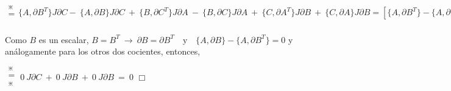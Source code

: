 \documentclass[a4paper,10pt]{article}
\begin{document}
$\begin{matrix} _\divideontimes \\ =  \\ \, \end{matrix}
\{A, \partial B^T\}J \partial C - \ \{A,\partial B\}J \partial C \ 
+ \ 
\{B, \partial  C^T\}J \partial A \ -\  \{B,\partial C\} J \partial A \ 
+ \ 
\{C, \partial  A^T\} J \partial  B \ + \ \{C,\partial A\} J \partial B
= 
[\{A,\partial B^T\}-\{A,\partial B\}]J\partial C+
[\{B,\partial C^T\}-\{B,\partial C\}]J\partial A+
[\{C,\partial A^T\}-\{C,\partial A\}]J\partial B
\begin{matrix} _\divideontimes \\ =  \\ ^\divideontimes \end{matrix}$

Como $B$ es un escalar, $B=B^T \ \to \ \partial B=\partial B^T \quad \text{y} \quad {\{A,\partial B\}-\{A,\partial B^T\}}=0$ y análogamente para los otros dos cocientes, entonces,

$\begin{matrix} _\divideontimes \\ =  \\ ^\divideontimes \end{matrix}
\ 0\ J\partial C \ + \  0\ J\partial B \ + \  0\ J\partial B\ =\ 0$  \hspace{9.5cm} $\Box$


	
\end{document}
